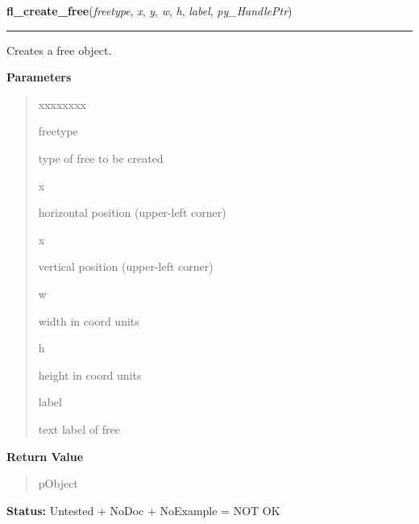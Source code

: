     \label{xformslib:library:fl_create_free}

    \vspace{0.5ex}

\hspace{.8\funcindent}\begin{boxedminipage}{\funcwidth}

    \raggedright \textbf{fl\_create\_free}(\textit{freetype}, \textit{x}, \textit{y}, \textit{w}, \textit{h}, \textit{label}, \textit{py\_HandlePtr})

    \vspace{-1.5ex}

    \rule{\textwidth}{0.5\fboxrule}
\setlength{\parskip}{2ex}
    Creates a free object.

\setlength{\parskip}{1ex}
      \textbf{Parameters}
      \vspace{-1ex}

      \begin{quote}
        \begin{Ventry}{xxxxxxxx}

          \item[freetype]

          type of free to be created

          \item[x]

          horizontal position (upper-left corner)

          \item[x]

          vertical position (upper-left corner)

          \item[w]

          width in coord units

          \item[h]

          height in coord units

          \item[label]

          text label of free

        \end{Ventry}

      \end{quote}

      \textbf{Return Value}
    \vspace{-1ex}

      \begin{quote}
      pObject

      \end{quote}

\textbf{Status:} Untested + NoDoc + NoExample = NOT OK



    \end{boxedminipage}

